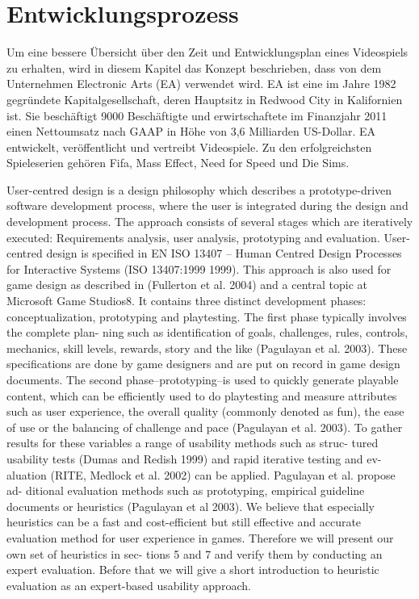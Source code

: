 \section{Entwicklungsprozess}
\label{cha:entwicklungs-und_zeitplan}
Um eine bessere Übersicht über den Zeit und Entwicklungsplan eines Videospiels zu erhalten, wird in diesem Kapitel das Konzept beschrieben, dass von dem Unternehmen Electronic Arts (EA) verwendet wird. EA ist eine im Jahre 1982 gegründete Kapitalgesellschaft, deren Hauptsitz in Redwood City in Kalifornien ist. Sie beschäftigt 9000 Beschäftigte und erwirtschaftete im Finanzjahr 2011 einen Nettoumsatz nach GAAP in Höhe von 3,6 Milliarden US-Dollar. EA entwickelt, veröffentlicht und vertreibt Videospiele. Zu den erfolgreichsten Spieleserien gehören Fifa, Mass Effect, Need for Speed und Die Sims.


User-centred design is a design philosophy which describes a prototype-driven software development process, where the user is integrated during the design and development process. The approach consists of several stages which are iteratively executed: Requirements analysis, user analysis, prototyping and evaluation. User- centred design is specified in EN ISO 13407 – Human Centred Design Processes for Interactive Systems (ISO 13407:1999 1999). This approach is also used for game design as described in (Fullerton et al. 2004) and a central topic at Microsoft Game Studios8. It contains three distinct development phases: conceptualization, prototyping and playtesting. The first phase typically involves the complete plan- ning such as identification of goals, challenges, rules, controls, mechanics, skill levels, rewards, story and the like (Pagulayan et al. 2003). These specifications are done by game designers and are put on record in game design documents.
The second phase–prototyping–is used to quickly generate playable content, which can be efficiently used to do playtesting and measure attributes such as user experience, the overall quality (commonly denoted as fun), the ease of use or the balancing of challenge and pace (Pagulayan et al. 2003).
To gather results for these variables a range of usability methods such as struc- tured usability tests (Dumas and Redish 1999) and rapid iterative testing and ev- aluation (RITE, Medlock et al. 2002) can be applied. Pagulayan et al. propose ad- ditional evaluation methods such as prototyping, empirical guideline documents or heuristics (Pagulayan et al 2003). We believe that especially heuristics can be a fast and cost-efficient but still effective and accurate evaluation method for user experience in games. Therefore we will present our own set of heuristics in sec- tions 5 and 7 and verify them by conducting an expert evaluation. Before that we will give a short introduction to heuristic evaluation as an expert-based usability approach.


